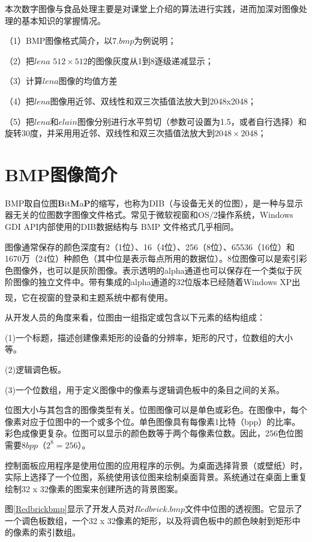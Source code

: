 \documentclass[UTF8]{ctexart}
\newcommand{\upcite}[1]{\textsuperscript{\textsuperscript{\cite{#1}}}}
\begin{document}
本次数字图像与食品处理主要是对课堂上介绍的算法进行实践，进而加深对图像处理的基本知识的掌握情况。

（1）BMP图像格式简介，以$7.bmp$为例说明；

（2）把$lena$ $512 \times 512$的图像灰度从1到8逐级递减显示；

（3）计算$lena$图像的均值方差

（4）把$lena$图像用近邻、双线性和双三次插值法放大到2048x2048；

（5）把$lena$和$elain$图像分别进行水平剪切（参数可设置为1.5，或者自行选择）和旋转30度，并采用用近邻、双线性和双三次插值法放大到$2048\times2048$；

\section{BMP图像简介}
BMP取自位图\textbf{B}it\textbf{M}a\textbf{P}的缩写，也称为DIB（与设备无关的位图），是一种与显示器无关的位图数字图像文件格式。常见于微软视窗和OS/2操作系统，Windows GDI API内部使用的DIB数据结构与 BMP 文件格式几乎相同。

图像通常保存的颜色深度有2（1位）、16（4位）、256（8位）、65536（16位）和1670万（24位）种颜色（其中位是表示每点所用的数据位）。8位图像可以是索引彩色图像外，也可以是灰阶图像。表示透明的alpha通道也可以保存在一个类似于灰阶图像的独立文件中。带有集成的alpha通道的32位版本已经随着Windows XP出现，它在视窗的登录和主题系统中都有使用\upcite{MSdoc}。

从开发人员的角度来看，位图由一组指定或包含以下元素的结构组成：

(1)一个标题，描述创建像素矩形的设备的分辨率，矩形的尺寸，位数组的大小等。

(2)逻辑调色板。

(3)一个位数组，用于定义图像中的像素与逻辑调色板中的条目之间的关系。

位图大小与其包含的图像类型有关。位图图像可以是单色或彩色。在图像中，每个像素对应于位图中的一个或多个位。单色图像具有每像素1比特（bpp）的比率。彩色成像更复杂。位图可以显示的颜色数等于两个每像素位数。因此，256色位图需要8$bpp$（$2 ^ 8 = 256$）。

控制面板应用程序是使用位图的应用程序的示例。为桌面选择背景（或壁纸）时，实际上选择了一个位图，系统使用该位图来绘制桌面背景。系统通过在桌面上重复绘制32 x 32像素的图案来创建所选的背景图案。

图\ref{Redbrickbmp}显示了开发人员对$Redbrick.bmp$文件中位图的透视图。它显示了一个调色板数组，一个32 x 32像素的矩形，以及将调色板中的颜色映射到矩形中的像素的索引数组。
\end{document}
